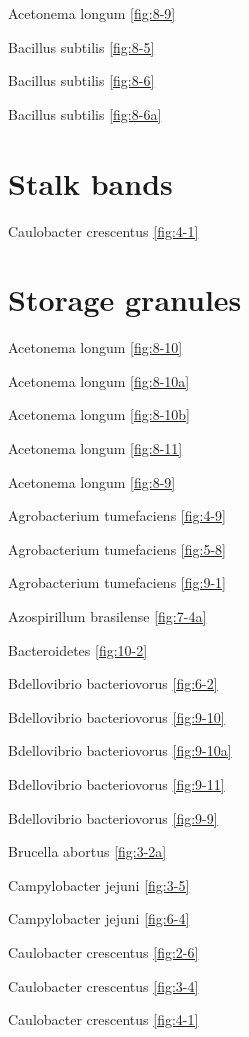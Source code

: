 \documentclass[]{tufte-book}
\begin{document}
Acetonema longum \ref{fig:8-9}

Bacillus subtilis \ref{fig:8-5}

Bacillus subtilis \ref{fig:8-6}

Bacillus subtilis \ref{fig:8-6a}

\hypertarget{stalk-bands-1}{%
\section*{Stalk bands}\label{stalk-bands-1}}

Caulobacter crescentus \ref{fig:4-1}

\hypertarget{storage-granules}{%
\section*{Storage granules}\label{storage-granules}}

Acetonema longum \ref{fig:8-10}

Acetonema longum \ref{fig:8-10a}

Acetonema longum \ref{fig:8-10b}

Acetonema longum \ref{fig:8-11}

Acetonema longum \ref{fig:8-9}

Agrobacterium tumefaciens \ref{fig:4-9}

Agrobacterium tumefaciens \ref{fig:5-8}

Agrobacterium tumefaciens \ref{fig:9-1}

Azospirillum brasilense \ref{fig:7-4a}

Bacteroidetes \ref{fig:10-2}

Bdellovibrio bacteriovorus \ref{fig:6-2}

Bdellovibrio bacteriovorus \ref{fig:9-10}

Bdellovibrio bacteriovorus \ref{fig:9-10a}

Bdellovibrio bacteriovorus \ref{fig:9-11}

Bdellovibrio bacteriovorus \ref{fig:9-9}

Brucella abortus \ref{fig:3-2a}

Campylobacter jejuni \ref{fig:3-5}

Campylobacter jejuni \ref{fig:6-4}

Caulobacter crescentus \ref{fig:2-6}

Caulobacter crescentus \ref{fig:3-4}

Caulobacter crescentus \ref{fig:4-1}
\end{document}
